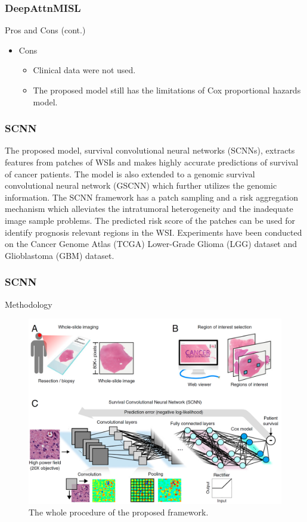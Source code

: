 \documentclass{beamer}
\begin{document}
	\begin{frame}
		\frametitle{DeepAttnMISL}
		Pros and Cons (cont.)
		\begin{itemize}
			\item Cons
			\begin{itemize}
				\item Clinical data were not used.
				\item The proposed model still has the limitations of Cox proportional hazards model.
			\end{itemize}
		\end{itemize}
	\end{frame}
	
	\begin{frame}
		\frametitle{SCNN}
		The proposed model, survival convolutional neural networks (SCNNs), extracts features from patches of WSIs and makes highly accurate predictions of survival of cancer patients. The model is also extended to a genomic survival convolutional neural network (GSCNN) which further utilizes the genomic information. The SCNN framework has a patch sampling and a risk aggregation mechanism which alleviates the intratumoral heterogeneity and the inadequate image sample problems. The predicted risk score of the patches can be used for identify prognosis relevant regions in the WSI. Experiments have been conducted on the Cancer Genome Atlas (TCGA) Lower-Grade Glioma (LGG) dataset and Glioblastoma (GBM) dataset.
	\end{frame}
	
	\begin{frame}
		\frametitle{SCNN}
		Methodology
		
		\begin{figure}[H]
			\centering
			\includegraphics[scale=0.12]{figures/scnn-overall.png}
			\caption{The whole procedure of the proposed framework.}
			\label{fig:scnn-overall}
		\end{figure}
	\end{frame}
\end{document}

